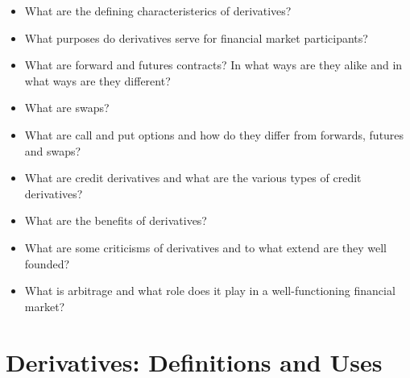 \documentclass[fleqn,10pt]{SelfArx} %
\begin{document}
\newpage
\begin{itemize}
	\item What are the defining characteristerics of derivatives?
	\item What purposes do derivatives serve for financial market participants?
	\item What are forward and futures contracts? In what ways are they alike and in what ways are they different?
	\item What are swaps?
	\item What are call and put options and how do they differ from forwards, futures and swaps?
	\item What are credit derivatives and what are the various types of credit derivatives?
	\item What are the benefits of derivatives?
	\item What are some criticisms of derivatives and to what extend are they well founded?
	\item What is arbitrage and what role does it play in a well-functioning financial market?
\end{itemize}

\newpage
\section{Derivatives: Definitions and Uses}







\end{document}
